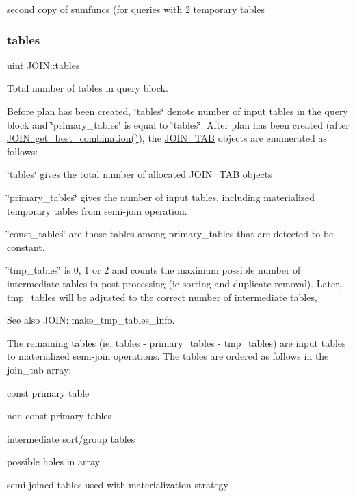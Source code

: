 second copy of sumfuncs (for queries with 2 temporary tables \mbox{\label{classJOIN_a38273ba29a6c872841db203f65c0ce33}} 
\subsubsection{\texorpdfstring{tables}{tables}}
{\footnotesize\ttfamily uint J\+O\+I\+N\+::tables}



Total number of tables in query block. 

Before plan has been created, \char`\"{}tables\char`\"{} denote number of input tables in the query block and \char`\"{}primary\+\_\+tables\char`\"{} is equal to \char`\"{}tables\char`\"{}. After plan has been created (after \mbox{\hyperlink{group__Query__Optimizer_gae9c1cf0874f4bda777557d012148e059}{J\+O\+I\+N\+::get\+\_\+best\+\_\+combination()}}), the \mbox{\hyperlink{classJOIN__TAB}{J\+O\+I\+N\+\_\+\+T\+AB}} objects are enumerated as follows\+:
\begin{DoxyItemize}
\item \char`\"{}tables\char`\"{} gives the total number of allocated \mbox{\hyperlink{classJOIN__TAB}{J\+O\+I\+N\+\_\+\+T\+AB}} objects
\item \char`\"{}primary\+\_\+tables\char`\"{} gives the number of input tables, including materialized temporary tables from semi-\/join operation.
\item \char`\"{}const\+\_\+tables\char`\"{} are those tables among primary\+\_\+tables that are detected to be constant.
\item \char`\"{}tmp\+\_\+tables\char`\"{} is 0, 1 or 2 and counts the maximum possible number of intermediate tables in post-\/processing (ie sorting and duplicate removal). Later, tmp\+\_\+tables will be adjusted to the correct number of intermediate tables, \begin{DoxySeeAlso}{See also}
J\+O\+I\+N\+::make\+\_\+tmp\+\_\+tables\+\_\+info.
\end{DoxySeeAlso}

\item The remaining tables (ie. tables -\/ primary\+\_\+tables -\/ tmp\+\_\+tables) are input tables to materialized semi-\/join operations. The tables are ordered as follows in the join\+\_\+tab array\+:
\begin{DoxyEnumerate}
\item const primary table
\item non-\/const primary tables
\item intermediate sort/group tables
\item possible holes in array
\item semi-\/joined tables used with materialization strategy 
\end{DoxyEnumerate}
\end{DoxyItemize}\mbox{\label{classJOIN_a6ebe9f41a938e8bcf950852141aa5cad}} 
